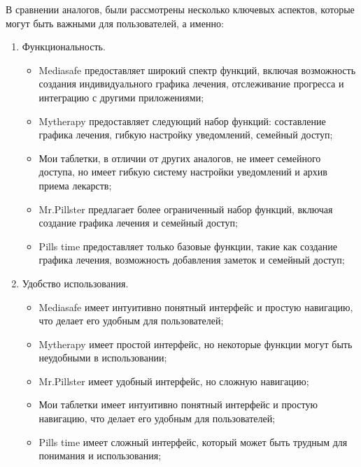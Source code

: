     В сравнении аналогов, были рассмотрены несколько ключевых аспектов, которые могут быть важными для пользователей, а именно:

    \begin{enumerate}
        \item Функциональность.
        \begin{itemize}
            \item Mediasafe предоставляет широкий спектр функций, включая возможность создания индивидуального графика лечения, отслеживание прогресса и интеграцию с другими приложениями;
            \item Mytherapy предоставляет следующий набор функций: составление графика лечения, гибкую настройку уведомлений, семейный доступ;
            \item Мои таблетки, в отличии от других аналогов, не имеет семейного доступа, но имеет гибкую систему настройки уведомлений и архив приема лекарств;
            \item Mr.Pillster предлагает более ограниченный набор функций, включая создание графика лечения и семейный доступ;
            \item Pills time предоставляет только базовые функции, такие как создание графика лечения, возможность добавления заметок и семейный доступ;
        \end{itemize}
    
        \item Удобство использования.
        \begin{itemize}
            \item Mediasafe имеет интуитивно понятный интерфейс и простую навигацию, что делает его удобным для пользователей;
            \item Mytherapy имеет простой интерфейс, но некоторые функции могут быть неудобными в использовании;
            \item Mr.Pillster имеет удобный интерфейс, но сложную навигацию;
            \item Мои таблетки имеет интуитивно понятный интерфейс и простую навигацию, что делает его удобным для пользователей;
            \item Pills time имеет сложный интерфейс, который может быть трудным для понимания и использования;
        \end{itemize}
    

\end{enumerate}
